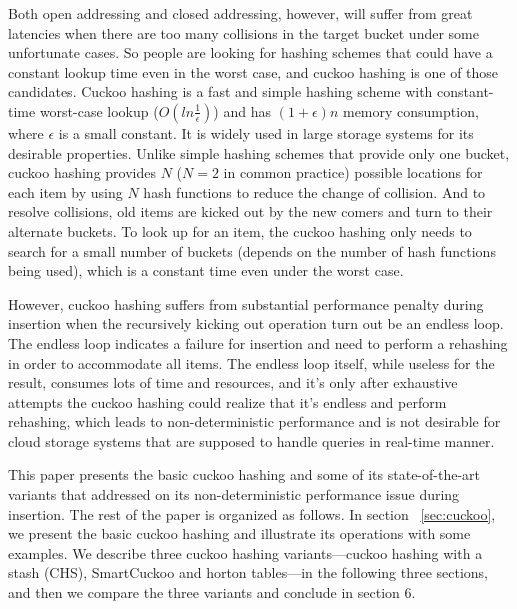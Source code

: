 \documentclass[runningheads]{llncs}
\begin{document}
Both open addressing and closed addressing, however, will suffer from great latencies when there are too many collisions in the target bucket under some unfortunate cases. So people are looking for hashing schemes that could have a constant lookup time even in the worst case, and cuckoo hashing is one of those candidates. Cuckoo hashing is a fast and simple hashing scheme with constant-time worst-case lookup ($O(ln\frac{1}{\epsilon})$) and has $(1+\epsilon)n$ memory consumption, where $\epsilon$ is a small constant. It is widely used in large storage systems for its desirable properties. Unlike simple hashing schemes that provide only one bucket, cuckoo hashing provides $N$ ($N=2$ in common practice) possible locations for each item by using $N$ hash functions to reduce the change of collision. And to resolve collisions, old items are kicked out by the new comers and turn to their alternate buckets. To look up for an item, the cuckoo hashing only needs to search for a small number of buckets (depends on the number of hash functions being used), which is a constant time even under the worst case.

However, cuckoo hashing suffers from substantial performance penalty during insertion when the recursively kicking out operation turn out be an endless loop. The endless loop indicates a failure for insertion and need to perform a rehashing in order to accommodate all items. The endless loop itself, while useless for the result, consumes lots of time and resources, and it's only after exhaustive attempts the cuckoo hashing could realize that it's endless and perform rehashing, which leads to non-deterministic performance and is not desirable for cloud storage systems that are supposed to handle queries in real-time manner. 

This paper presents the basic cuckoo hashing and some of its state-of-the-art variants that addressed on its non-deterministic performance issue during insertion. The rest of the paper is organized as follows. In section ~\ref{sec:cuckoo}, we present the basic cuckoo hashing and illustrate its operations with some examples. We describe three cuckoo hashing variants---cuckoo hashing with a stash (CHS), SmartCuckoo and horton tables---in the following three sections, and then we compare the three variants and conclude in section 6.
\end{document}
